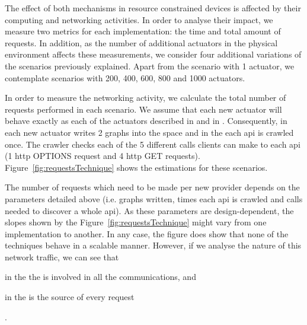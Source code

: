 


\bigskip

The effect of both mechanisms in resource constrained devices is affected by their computing and networking activities.
In order to analyse their impact, we measure two metrics for each implementation: the time and total amount of requests.
In addition, as the number of additional actuators in the physical environment affects these measurements,
we consider four additional variations of the scenarios previously explained. %
Apart from the scenario with 1 actuator, we contemplate scenarios with 200, 400, 600, 800 and 1000 actuators.


In order to measure the networking activity, we calculate the total number of requests performed in each scenario.
We assume that each new actuator will behave exactly as each of the actuators described in \implSpace{} and in \implRest{}.
Consequently, in \spaceActuation{} each new actuator writes 2 graphs into the space and in the \restActuation{} each \ac{api} is crawled once.
The crawler checks each of the 5 different calls clients can make to each \ac{api} (1 \acs{http} OPTIONS request and 4 \acs{http} GET requests).
Figure~\ref{fig:requestsTechnique} shows the estimations for these scenarios.




The number of requests which need to be made per new provider depends on the parameters detailed above (i.e. graphs written, times each \ac{api} is crawled and calls needed to discover a whole \ac{api}).
As these parameters are design-dependent, the slopes shown by the Figure~\ref{fig:requestsTechnique} might vary from one implementation to another.
In any case, the figure does show that none of the techniques behave in a scalable manner.
However, if we analyse the nature of this network traffic, we can see that
\begin{enumerate*}[label=\itshape\bfseries(\arabic*\upshape)]
  \item in the \spaceActuation{} the \Space{} is involved in all the communications, and
  \item in the \restActuation{} \nodeConsRest{} is the source of every request
\end{enumerate*}.


